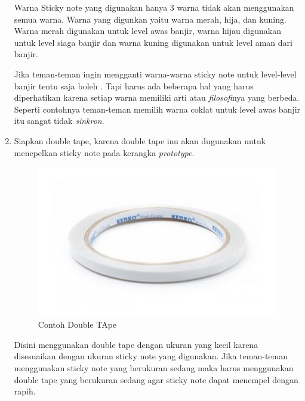\begin{enumerate}
\par Warna Sticky note yang digunakan hanya 3 warna tidak akan menggunakan semua warna. Warna yang digunkan yaitu warna merah, hija, dan kuning. Warna merah digunakan untuk level awas banjir, warna hijau digunakan untuk level siaga banjir dan warna kuning digunakan untuk level aman dari banjir.

\par Jika teman-teman ingin mengganti warna-warna sticky note untuk level-level banjir tentu saja boleh . Tapi harus ada beberapa hal yang harus diperhatikan karena setiap warna memiliki arti atau \textit{filosofi}nya yang berbeda. Seperti contohnya teman-teman memilih warna coklat untuk level awas banjir itu sangat tidak \textit{sinkron}.

\item Siapkan double tape, karena double tape inu akan dugunakan untuk menepelkan sticky note pada kerangka \textit{prototype}.

\begin{figure}[H]
\centering
\includegraphics[width=1\textwidth]{figures/double.jpg}
\caption{Contoh Double TApe}
\label{print}
\end{figure}

\par Disini menggunakan double tape dengan ukuran yang kecil karena disesuaikan dengan ukuran sticky note yang digunakan. Jika teman-teman menggunakan sticky note yang berukuran sedang maka harus menggunakan double tape yang berukuran sedang agar sticky note dapat menempel dengan rapih.


\end{enumerate}
